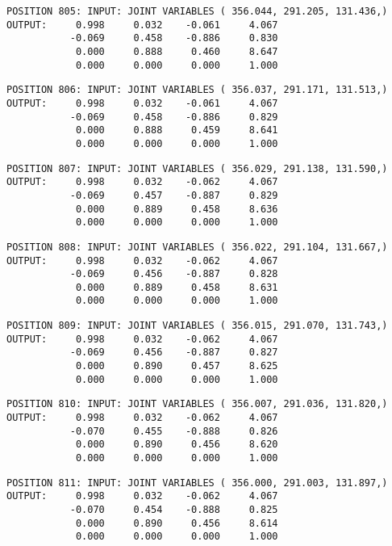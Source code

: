 \begin{verbatim}
POSITION 805: INPUT: JOINT VARIABLES ( 356.044, 291.205, 131.436,)
OUTPUT:     0.998     0.032    -0.061     4.067
           -0.069     0.458    -0.886     0.830
            0.000     0.888     0.460     8.647
            0.000     0.000     0.000     1.000
\end{verbatim} \pagebreak[1]\begin{verbatim}
POSITION 806: INPUT: JOINT VARIABLES ( 356.037, 291.171, 131.513,)
OUTPUT:     0.998     0.032    -0.061     4.067
           -0.069     0.458    -0.886     0.829
            0.000     0.888     0.459     8.641
            0.000     0.000     0.000     1.000
\end{verbatim} \pagebreak[1]\begin{verbatim}
POSITION 807: INPUT: JOINT VARIABLES ( 356.029, 291.138, 131.590,)
OUTPUT:     0.998     0.032    -0.062     4.067
           -0.069     0.457    -0.887     0.829
            0.000     0.889     0.458     8.636
            0.000     0.000     0.000     1.000
\end{verbatim} \pagebreak[1]\begin{verbatim}
POSITION 808: INPUT: JOINT VARIABLES ( 356.022, 291.104, 131.667,)
OUTPUT:     0.998     0.032    -0.062     4.067
           -0.069     0.456    -0.887     0.828
            0.000     0.889     0.458     8.631
            0.000     0.000     0.000     1.000
\end{verbatim} \pagebreak[1]\begin{verbatim}
POSITION 809: INPUT: JOINT VARIABLES ( 356.015, 291.070, 131.743,)
OUTPUT:     0.998     0.032    -0.062     4.067
           -0.069     0.456    -0.887     0.827
            0.000     0.890     0.457     8.625
            0.000     0.000     0.000     1.000
\end{verbatim} \pagebreak[1]\begin{verbatim}
POSITION 810: INPUT: JOINT VARIABLES ( 356.007, 291.036, 131.820,)
OUTPUT:     0.998     0.032    -0.062     4.067
           -0.070     0.455    -0.888     0.826
            0.000     0.890     0.456     8.620
            0.000     0.000     0.000     1.000
\end{verbatim} \pagebreak[1]\begin{verbatim}
POSITION 811: INPUT: JOINT VARIABLES ( 356.000, 291.003, 131.897,)
OUTPUT:     0.998     0.032    -0.062     4.067
           -0.070     0.454    -0.888     0.825
            0.000     0.890     0.456     8.614
            0.000     0.000     0.000     1.000
\end{verbatim} \pagebreak[1]\begin{verbatim}

\end{verbatim}
